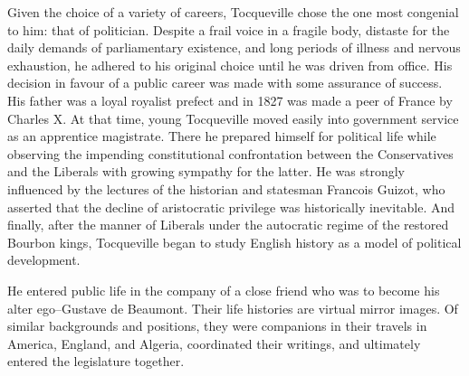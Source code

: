 \documentclass[12pt]{article}
\begin{document}
                                      Given the choice of a variety of careers, Tocqueville chose the one
                                      most congenial to him: that of politician. Despite a frail voice in a
                                      fragile body, distaste for the daily demands of parliamentary
                                      existence, and long periods of illness and nervous exhaustion, he
                                      adhered to his original choice until he was driven from office. His
                                      decision in favour of a public career was made with some assurance
                                      of success. His father was a loyal royalist prefect and in 1827 was
                                      made a peer of France by Charles X. At that time, young Tocqueville
                                      moved easily into government service as an apprentice magistrate.
                                      There he prepared himself for political life while observing the
                                      impending constitutional confrontation between the Conservatives
                                      and the Liberals with growing sympathy for the latter. He was
                                      strongly influenced by the lectures of the historian and statesman
                                      Francois Guizot, who asserted that the decline of aristocratic
                                      privilege was historically inevitable. And finally, after the manner of
                                      Liberals under the autocratic regime of the restored Bourbon kings,
                                      Tocqueville began to study English history as a model of political
                                      development. 




                                      He entered public life in the company of a close friend who was to
                                      become his alter ego--Gustave de Beaumont. Their life histories are
                                      virtual mirror images. Of similar backgrounds and positions, they
                                      were companions in their travels in America, England, and Algeria,
                                      coordinated their writings, and ultimately entered the legislature
                                      together. 
\end{document}
